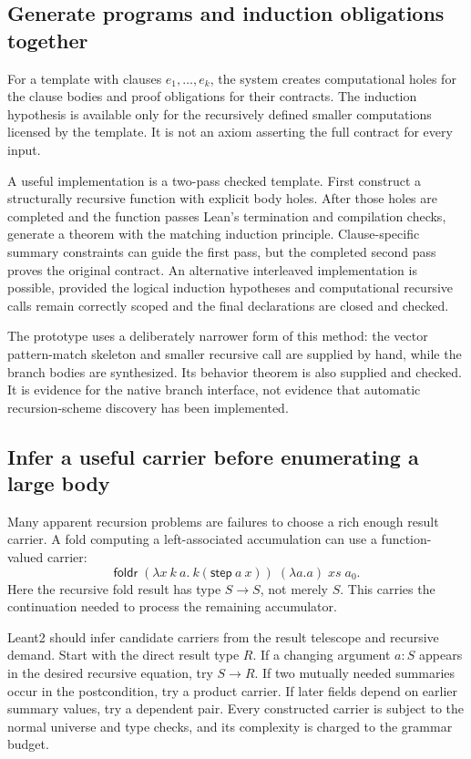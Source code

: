 \subsection{Generate programs and induction obligations together}
For a template with clauses $e_1,\ldots,e_k$, the system creates computational holes for the clause bodies and proof obligations for their contracts. The induction hypothesis is available only for the recursively defined smaller computations licensed by the template. It is not an axiom asserting the full contract for every input.

A useful implementation is a two-pass checked template. First construct a structurally recursive function with explicit body holes. After those holes are completed and the function passes Lean's termination and compilation checks, generate a theorem with the matching induction principle. Clause-specific summary constraints can guide the first pass, but the completed second pass proves the original contract. An alternative interleaved implementation is possible, provided the logical induction hypotheses and computational recursive calls remain correctly scoped and the final declarations are closed and checked.

The prototype uses a deliberately narrower form of this method: the vector pattern-match skeleton and smaller recursive call are supplied by hand, while the branch bodies are synthesized. Its behavior theorem is also supplied and checked. It is evidence for the native branch interface, not evidence that automatic recursion-scheme discovery has been implemented.

\subsection{Infer a useful carrier before enumerating a large body}
Many apparent recursion problems are failures to choose a rich enough result carrier. A fold computing a left-associated accumulation can use a function-valued carrier:
\[
 \mathsf{foldr}\;(\lambda x\ k\ a.\ k(\mathsf{step}\ a\ x))\;
                 (\lambda a.a)\;xs\;a_0.
\]
Here the recursive fold result has type $S\to S$, not merely $S$. This carries the continuation needed to process the remaining accumulator.

Leant2 should infer candidate carriers from the result telescope and recursive demand. Start with the direct result type $R$. If a changing argument $a:S$ appears in the desired recursive equation, try $S\to R$. If two mutually needed summaries occur in the postcondition, try a product carrier. If later fields depend on earlier summary values, try a dependent pair. Every constructed carrier is subject to the normal universe and type checks, and its complexity is charged to the grammar budget.

